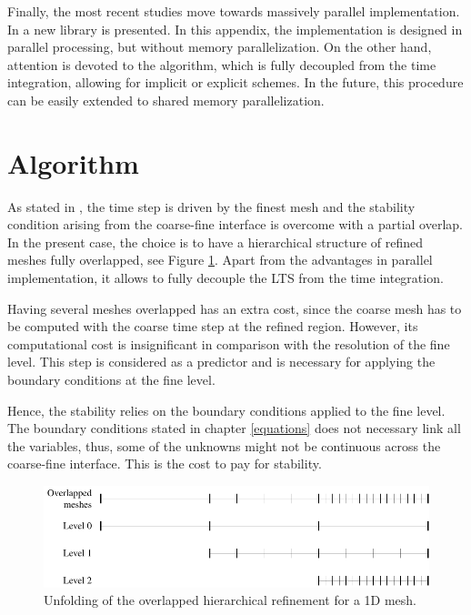 Finally, the most recent studies move towards massively parallel implementation. In \cite{baiges2016} a new library is presented. In this appendix, the implementation is designed in parallel processing, but without memory parallelization. On the other hand, attention is devoted to the algorithm, which is fully decoupled from the time integration, allowing for implicit or explicit schemes. In the future, this procedure can be easily extended to shared memory parallelization.


\section{Algorithm}

As stated in \cite{almquist2016,collino2003a}, the time step is driven by the finest mesh and the stability condition arising from the coarse-fine interface is overcome with a partial overlap. In the present case, the choice is to have a hierarchical structure of refined meshes fully overlapped, see Figure \ref{multilevel_overlap}. Apart from the advantages in parallel implementation, it allows to fully decouple the LTS from the time integration.

Having several meshes overlapped has an extra cost, since the coarse mesh has to be computed with the coarse time step at the refined region. However, its computational cost is insignificant in comparison with the resolution of the fine level. This step is considered as a predictor and is necessary for applying the boundary conditions at the fine level.

Hence, the stability relies on the boundary conditions applied to the fine level. The boundary conditions stated in chapter \ref{equations} does not necessary link all the variables, thus, some of the unknowns might not be continuous across the coarse-fine interface. This is the cost to pay for stability.

\begin{figure} [htpb]
    \centering
    \includegraphics[width=\textwidth]{img/multigrid/multilevel_overlap.pdf}
    \caption{Unfolding of the overlapped hierarchical refinement for a 1D mesh.}
    \label{multilevel_overlap}
\end{figure}

